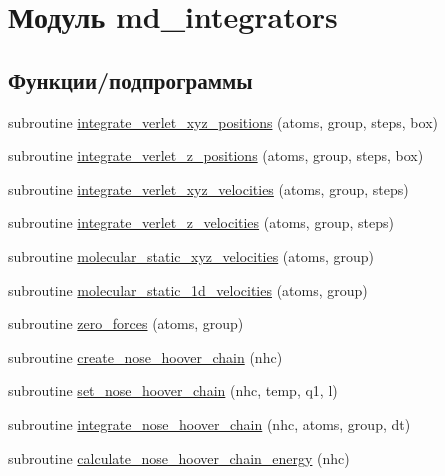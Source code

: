 \hypertarget{namespacemd__integrators}{}\section{Модуль md\+\_\+integrators}
\label{namespacemd__integrators}
\subsection*{Функции/подпрограммы}
\begin{DoxyCompactItemize}
\item 
subroutine \mbox{\hyperlink{namespacemd__integrators_a46897b8968c1901883654589ef731eb2}{integrate\+\_\+verlet\+\_\+xyz\+\_\+positions}} (atoms, group, steps, box)
\item 
subroutine \mbox{\hyperlink{namespacemd__integrators_a89e015a65c39454223a09736f095aef0}{integrate\+\_\+verlet\+\_\+z\+\_\+positions}} (atoms, group, steps, box)
\item 
subroutine \mbox{\hyperlink{namespacemd__integrators_a4aafa379de6ec22530aa0c426855689e}{integrate\+\_\+verlet\+\_\+xyz\+\_\+velocities}} (atoms, group, steps)
\item 
subroutine \mbox{\hyperlink{namespacemd__integrators_ab71be6f8ca48e91d1a0e84d70b3176ac}{integrate\+\_\+verlet\+\_\+z\+\_\+velocities}} (atoms, group, steps)
\item 
subroutine \mbox{\hyperlink{namespacemd__integrators_a37c12502ddb5537b8b963074dcd33132}{molecular\+\_\+static\+\_\+xyz\+\_\+velocities}} (atoms, group)
\item 
subroutine \mbox{\hyperlink{namespacemd__integrators_aa4c7e5a4cfdd19fa542fccae43e9d35a}{molecular\+\_\+static\+\_\+1d\+\_\+velocities}} (atoms, group)
\item 
subroutine \mbox{\hyperlink{namespacemd__integrators_afaf5cf45b5c0a8363d40dc012c954a1a}{zero\+\_\+forces}} (atoms, group)
\item 
subroutine \mbox{\hyperlink{namespacemd__integrators_aa74788b2d003c16024b8eb999ea01c3c}{create\+\_\+nose\+\_\+hoover\+\_\+chain}} (nhc)
\item 
subroutine \mbox{\hyperlink{namespacemd__integrators_a20d655980db9ce88983d738fc91ff021}{set\+\_\+nose\+\_\+hoover\+\_\+chain}} (nhc, temp, q1, l)
\item 
subroutine \mbox{\hyperlink{namespacemd__integrators_a769781abbe7ac3aaacf761d6321d4722}{integrate\+\_\+nose\+\_\+hoover\+\_\+chain}} (nhc, atoms, group, dt)
\item 
subroutine \mbox{\hyperlink{namespacemd__integrators_a67084641a81f648ac71c15c20428c015}{calculate\+\_\+nose\+\_\+hoover\+\_\+chain\+\_\+energy}} (nhc)
\end{DoxyCompactItemize}


